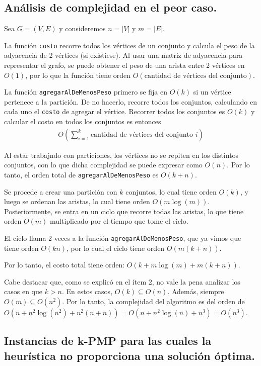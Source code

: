 \newpage
\subsection{Análisis de complejidad en el peor caso.}
\vspace*{0.3cm}

Sea $G = (V,E)$ y consideremos $n = |V|$ y $m = |E|$.

La función \texttt{costo} recorre todos los vértices de un conjunto y calcula
el peso de la adyacencia de 2 vértices (si existiese). Al usar una matriz de
adyacencia para representar el grafo, se puede obtener el peso de una arista
entre 2 vértices en $O(1)$, por lo que la función tiene orden $O(\text{cantidad
de vértices del conjunto})$.

La función \texttt{agregarAlDeMenosPeso} primero se fija en $O(k)$ si un
vértice pertenece a la partición. De no hacerlo, recorre todos los conjuntos,
calculando en cada uno el \texttt{costo} de agregar el vértice. Recorrer todos
los conjuntos es $O(k)$ y calcular el costo en todos los conjuntos es entonces
\begin{align*}
  O(\sum_{i=1}^k \text{cantidad de vértices del conjunto } i)
\end{align*}

Al estar trabajndo con particiones, los vértices no se repiten en los distintos
conjuntos, con lo que dicha complejidad se puede expresar como $O(n)$. Por lo
tanto, el orden total de \texttt{agregarAlDeMenosPeso} es $O(k + n)$.

Se procede a crear una partición con $k$ conjuntos, lo cual tiene orden $O(k)$,
y luego se ordenan las aristas, lo cual tiene orden $O(m\log(m))$.
Posteriormente, se entra en un ciclo que recorre todas las aristas, lo que tiene
orden $O(m)$ multiplicado por el tiempo que tome el ciclo.

El ciclo llama 2 veces a la función \texttt{agregarAlDeMenosPeso}, que ya vimos
que tiene orden $O(kn)$, por lo cual el ciclo tiene orden $O(m(k + n))$.

Por lo tanto, el costo total tiene orden: $O(k + m\log(m) + m(k + n))$.

Cabe destacar que, como se explicó en el ítem 2, no vale la pena analizar los
casos en que $k > n$. En estos casos, $O(k) \subseteq O(n)$. Además, siempre
$O(m) \subseteq O(n^2)$. Por lo tanto, la complejidad del algoritmo es del
orden de $O(n + n^2 \log(n^2) + n^2 (n + n)) = O(n + n^2 \log(n) + n^3) =
O(n^3)$.

\newpage
\subsection{Instancias de k-PMP para las cuales la heurística no proporciona
            una solución óptima.}
\vspace*{0.3cm}

